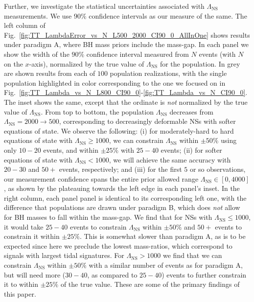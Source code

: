 \documentclass[aps,prd,amsmath,floats,floatfix, twocolumn,
superscriptaddress,nofootinbib,showpacs]{revtex4-1}
\newcommand{\lambdans}{\Lambda_\mathrm{NS}}
\begin{document}
Further, we investigate the statistical uncertainties associated with
$\lambdans$ measurements. We use $90\%$ confidence intervals as our measure of
the same. The left column of 
Fig.~\ref{fig:TT_LambdaError_vs_N_L500_2000_CI90_0_AllInOne} shows results
under paradigm A, where BH mass priors include the mass-gap. In each panel
we show the width of the $90\%$ confidence interval measured from $N$ events
(with $N$ on the $x$-axis), normalized by the true value of $\lambdans$ for
the population. In grey are shown results from each of $100$ population
realizations, with the single population highlighted in color corresponding
to the one we focused on in 
Fig.~\ref{fig:TT_Lambda_vs_N_L800_CI90_0}-\ref{fig:TT_Lambda_vs_N_CI90_0}.
The inset shows the same, except that the ordinate is {\it not} normalized by
the true value of $\lambdans$. From top to bottom, the population $\lambdans$
decreases from $\lambdans=2000\rightarrow 500$, corresponding to decreasingly
deformable NSs with softer equations of state. We observe the following:
(i) for moderately-hard to hard equations of state with $\lambdans\geq 1000$,
we can constrain $\lambdans$ within $\pm 50\%$ using only $10-20$ events, and
within $\pm 25\%$ with $25-40$ events; (ii) for softer equations of state with
$\lambdans<1000$, we will achieve the same accuracy with $20-30$ and $50+$ 
events, respectively; and (iii) for the first $5$ or so observations, our
measurement confidence spans the entire prior allowed range 
$\lambdans\in[0,4000]$, as shown by the plateauing towards the left edge in
each panel's inset.
% 
In the right column, each panel panel is identical to its corresponding left
one, with the difference that populations are drawn under paradigm B, which
does {\it not} allow for BH masses to fall within the mass-gap. We find that
for NSs with $\lambdans\leq 1000$, it would take $25-40$ events to
constrain $\lambdans$ within $\pm 50\%$ and $50+$ events to constrain it
within $\pm 25\%$. This is somewhat slower than paradigm A, as is to be
expected since here we preclude the lowest mass-ratios, which correspond to
signals with largest tidal signatures. For $\lambdans>1000$ we find that we
can constrain $\lambdans$ within $\pm 50\%$ with a similar number of events as
for paradigm A, but will need more ($30-40$, as compared to $25-40$) events
to further constrain it to within $\pm 25\%$ of the true value.
% 
These are some of the primary findings of this paper.
\end{document}
